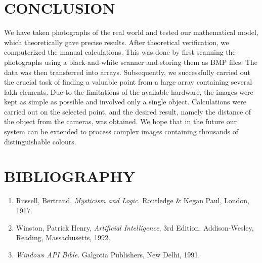 \documentclass[12pt]{report}
\begin{document}
\chapter{CONCLUSION} We have taken photographs of the real world and tested our mathematical model, which theoretically gave precise results. After theoretical verification, we computerized the manual calculations. This was done by first scanning the photographs using a black-and-white scanner and storing them as BMP files. The data was then transferred into arrays. Subsequently, we successfully carried out the crucial task of finding a valuable point from a large array containing several lakh elements. Due to the limitations of the available hardware, the images were kept as simple as possible and involved only a single object. Calculations were carried out on the selected point, and the desired result, namely the distance of the object from the cameras, was obtained. We hope that in the future our system can be extended to process complex images containing thousands of distinguishable colours.

\chapter{BIBLIOGRAPHY} \begin{enumerate} \item Russell, Bertrand, \textit{Mysticism and Logic}. Routledge \& Kegan Paul, London, 1917. \vspace{0.5cm} \item Winston, Patrick Henry, \textit{Artificial Intelligence}, 3rd Edition. Addison-Wesley, Reading, Massachusetts, 1992. \vspace{0.5cm} \item \textit{Windows API Bible}. Galgotia Publishers, New Delhi, 1991. \end{enumerate}
\end{document}

